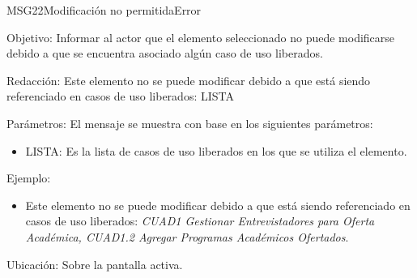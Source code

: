\begin{mensaje}{MSG22}{Modificación no permitida}{Error}
	\item [Objetivo:] Informar al actor que el elemento seleccionado no puede modificarse debido a que se encuentra asociado algún caso de uso liberados.
	\item[Redacción:] Este elemento no se puede modificar debido a que está siendo referenciado en casos de uso liberados: LISTA
	\item[Parámetros:] El mensaje se muestra con base en los siguientes parámetros:
	\begin{itemize}
		\item LISTA: Es la lista de casos de uso liberados en los que se utiliza el elemento.
	\end{itemize}
	\item[Ejemplo:] \begin{itemize}
		\item Este elemento no se puede modificar debido a que está siendo referenciado en casos de uso liberados: {\em CUAD1 Gestionar Entrevistadores para Oferta Académica, CUAD1.2 Agregar Programas Académicos Ofertados}.
	\end{itemize}
	\item [Ubicación:] Sobre la pantalla activa.
\end{mensaje}